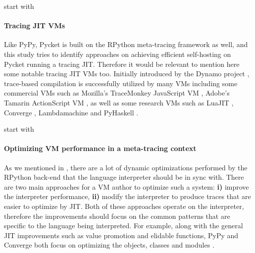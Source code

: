         \begin{paragraph-here}%
            start with \paragraph{Tracing JIT VMs}

            Like PyPy, Pycket is built on the RPython meta-tracing framework as
            well, and this study tries to identify approaches on achieving
            efficient self-hosting on Pycket running a tracing JIT. Therefore it
            would be relevant to mention here some notable tracing JIT VMs
            too. Initially introduced by the Dynamo project \cite{dynamo},
            trace-based compilation is successfully utilized by many VMs including
            some commercial VMs such as Mozilla's TraceMonkey JavaScript VM
            \cite{traceMonkey}, Adobe's Tamarin ActionScript VM \cite{tamarin}, as
            well as some research VMs such as LuaJIT \cite{LuaJITLanguageToolkit}, Converge
            \cite{converge:05}, Lambdamachine \cite{lambdamachine} and PyHaskell
            \cite{pyhaskell}.
        \end{paragraph-here}

        \begin{paragraph-here}%
            start with \paragraph{Optimizing VM performance in a meta-tracing context}

            As we mentioned in , there are a lot of dynamic
            optimizations performed by the RPython back-end that the language
            interpreter should be in sync with. There are two main approaches for
            a VM author to optimize such a system: \textbf{i)} improve the
            interpreter performance, \textbf{ii)} modify the interpreter to
            produce traces that are easier to optimize by JIT. Both of these
            approaches operate on the interpreter, therefore the improvements
            should focus on the common patterns that are specific to the language
            being interpreted. For example, along with the general JIT
            improvements such as value promotion and elidable functions, PyPy and
            Converge both focus on optimizing the objects, classes and modules
            \cite{bolz15-meta-vm}.
        \end{paragraph-here}


